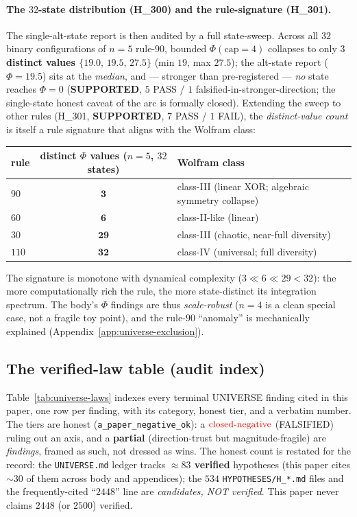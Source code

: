 \paragraph{The $32$-state distribution (H\_300) and the rule-signature (H\_301).}
The single-alt-state report is then audited by a full state-sweep. Across all
$32$ binary configurations of $n{=}5$ rule-$90$, bounded $\Phi(\mathrm{cap}{=}4)$
collapses to only \textbf{$3$ distinct values $\{19.0,\,19.5,\,27.5\}$} (min
$19$, max $27.5$); the alt-state report ($\Phi{=}19.5$) sits at the
\emph{median}, and --- stronger than pre-registered --- \emph{no} state reaches
$\Phi{=}0$ (\textbf{SUPPORTED}, $5$ PASS / $1$ falsified-in-stronger-direction;
the single-state honest caveat of the arc is formally closed). Extending the
sweep to other rules (H\_301, \textbf{SUPPORTED}, $7$ PASS / $1$ FAIL), the
\emph{distinct-value count} is itself a rule signature that aligns with the
Wolfram class:
\begin{center}
\begin{tabular}{lcl}
\toprule
rule & distinct $\Phi$ values ($n{=}5$, $32$ states) & Wolfram class \\
\midrule
$90$  & $\mathbf{3}$  & class-III (linear XOR; algebraic symmetry collapse) \\
$60$  & $\mathbf{6}$  & class-II-like (linear) \\
$30$  & $\mathbf{29}$ & class-III (chaotic, near-full diversity) \\
$110$ & $\mathbf{32}$ & class-IV (universal; full diversity) \\
\bottomrule
\end{tabular}
\end{center}
The signature is monotone with dynamical complexity
($3 \ll 6 \ll 29 < 32$): the more computationally rich the rule, the more
state-distinct its integration spectrum. The body's $\Phi$ findings are thus
\emph{scale-robust} ($n{=}4$ is a clean special case, not a fragile toy point),
and the rule-$90$ ``anomaly'' is mechanically explained (Appendix~\ref{app:universe-exclusion}).

\subsection{The verified-law table (audit index)}
\label{app:universe-table}

Table~\ref{tab:universe-laws} indexes every terminal UNIVERSE finding cited in
this paper, one row per finding, with its category, honest tier, and a verbatim
number. The tiers are honest (\texttt{a\_paper\_negative\_ok}): a $\mathbf{\textcolor{red}{\text{closed-negative}}}$
(FALSIFIED) ruling out an axis, and a \textbf{\textcolor{orange!85!black}{partial}}
(direction-trust but magnitude-fragile) are \emph{findings}, framed as such, not
dressed as wins. The honest count is restated for the record: the
\texttt{UNIVERSE.md} ledger tracks \textbf{$\approx 83$ verified} hypotheses
(this paper cites $\sim 30$ of them across body and appendices); the $534$
\texttt{HYPOTHESES/H\_*.md} files and the frequently-cited ``$2448$'' line are
\emph{candidates, NOT verified}. This paper never claims $2448$ (or $2500$)
verified.

